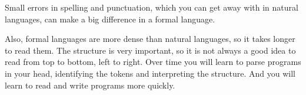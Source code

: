 






Small errors in spelling and punctuation, which you can get away with in natural languages, can make a big difference in a formal language.

Also, formal languages are more dense than natural languages, so it takes longer to read them.
The structure is very important, so it is not always a good idea to read from top to bottom, left to right.
Over time you will learn to parse programs in your head, identifying the tokens and interpreting the structure.
And you will learn to read and write programs more quickly.









